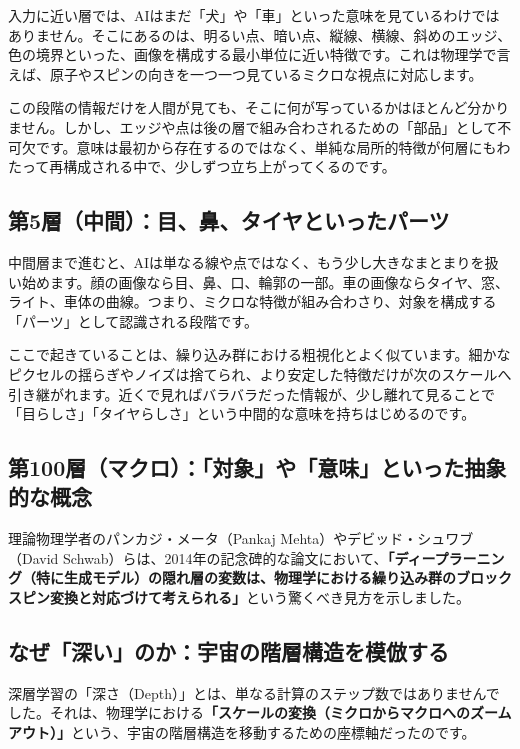 入力に近い層では、AIはまだ「犬」や「車」といった意味を見ているわけではありません。そこにあるのは、明るい点、暗い点、縦線、横線、斜めのエッジ、色の境界といった、画像を構成する最小単位に近い特徴です。これは物理学で言えば、原子やスピンの向きを一つ一つ見ているミクロな視点に対応します。

この段階の情報だけを人間が見ても、そこに何が写っているかはほとんど分かりません。しかし、エッジや点は後の層で組み合わされるための「部品」として不可欠です。意味は最初から存在するのではなく、単純な局所的特徴が何層にもわたって再構成される中で、少しずつ立ち上がってくるのです。

\subsection{第5層（中間）：目、鼻、タイヤといったパーツ}

中間層まで進むと、AIは単なる線や点ではなく、もう少し大きなまとまりを扱い始めます。顔の画像なら目、鼻、口、輪郭の一部。車の画像ならタイヤ、窓、ライト、車体の曲線。つまり、ミクロな特徴が組み合わさり、対象を構成する「パーツ」として認識される段階です。

ここで起きていることは、繰り込み群における粗視化とよく似ています。細かなピクセルの揺らぎやノイズは捨てられ、より安定した特徴だけが次のスケールへ引き継がれます。近くで見ればバラバラだった情報が、少し離れて見ることで「目らしさ」「タイヤらしさ」という中間的な意味を持ちはじめるのです。

\subsection{第100層（マクロ）：「対象」や「意味」といった抽象的な概念}

理論物理学者のパンカジ・メータ（Pankaj Mehta）やデビッド・シュワブ（David Schwab）らは、2014年の記念碑的な論文において、\textbf{「ディープラーニング（特に生成モデル）の隠れ層の変数は、物理学における繰り込み群のブロックスピン変換と対応づけて考えられる」}という驚くべき見方を示しました。

\subsection{なぜ「深い」のか：宇宙の階層構造を模倣する}

深層学習の「深さ（Depth）」とは、単なる計算のステップ数ではありませんでした。それは、物理学における\textbf{「スケールの変換（ミクロからマクロへのズームアウト）」}という、宇宙の階層構造を移動するための座標軸だったのです。

